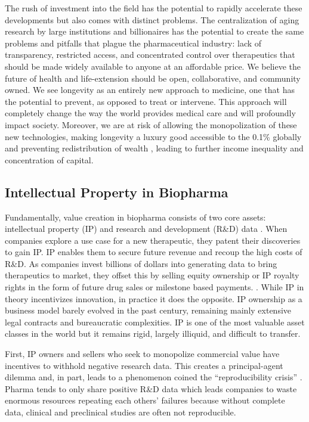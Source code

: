 \documentclass[12pt,letterpaper]{article}
\begin{document}
The rush of investment into the field has the potential to rapidly accelerate these developments but also comes with distinct problems. The centralization of aging research by large institutions and billionaires has the potential to create the same problems and pitfalls that plague the pharmaceutical industry: lack of transparency, restricted access, and concentrated control over therapeutics that should be made widely available to anyone at an affordable price. 
We believe the future of health and life-extension should be open, collaborative, and community owned. We see longevity as an entirely new approach to medicine, one that has the potential to prevent, as opposed to treat or intervene. This approach will completely change the way the world provides medical care and will profoundly impact society. Moreover, we are at risk of allowing the monopolization of these new technologies, making longevity a luxury good accessible to the 0.1\% globally and preventing redistribution of wealth \citep{Ihle2017}, leading to further income inequality and concentration of capital.

\subsection{Intellectual Property in Biopharma}
Fundamentally, value creation in biopharma consists of two core assets: intellectual property (IP) and research and development (R\&D) data \citep{Chandra2011}. When companies explore a use case for a new therapeutic, they patent their discoveries to gain IP. IP enables them to secure future revenue and recoup the high costs of R\&D. As companies invest billions of dollars into generating data to bring therapeutics to market, they offset this by selling equity ownership or IP royalty rights in the form of future drug sales or milestone based payments. \citep{Wouters2020}. While IP in theory incentivizes innovation, in practice it does the opposite. IP ownership as a business model barely evolved in the past century, remaining mainly extensive legal contracts and bureaucratic complexities. IP is one of the most valuable asset classes in the world but it remains rigid, largely illiquid, and difficult to transfer. 

First, IP owners and sellers who seek to monopolize commercial value have incentives to withhold negative research data. This creates a principal-agent dilemma and, in part, leads to a phenomenon coined the “reproducibility crisis” \citep{Sherkow2017}. Pharma tends to only share positive R\&D data which leads companies to waste enormous resources repeating each others’ failures because without complete data, clinical and preclinical studies are often not reproducible. 
\end{document}
